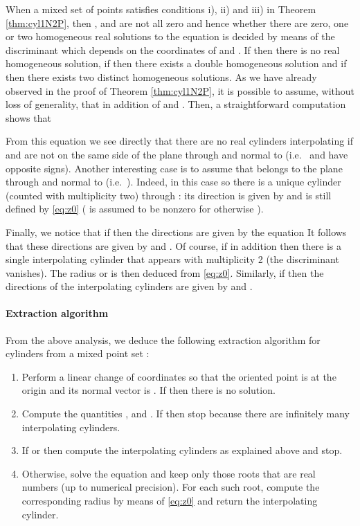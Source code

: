 \documentclass[5p]{elsarticle}
\newcommand{\com}[1]{{\color{black} #1}}
\begin{document}
When a mixed set of points  satisfies conditions i), ii) and iii) in \com{Theorem \ref{thm:cyl1N2P}}, then ,  and  are not all zero and hence \com{whether there are} zero, one or two homogeneous real solutions to the equation  is decided by means of the discriminant   which depends on the coordinates of  and . If  then there is no real homogeneous solution, if  then \com{there exists} a double homogeneous solution and if  then there exists two distinct homogeneous solutions. As we have already observed in the proof of Theorem \ref{thm:cyl1N2P}, it is possible to assume, without loss of generality, that  in addition of  and . Then, a straightforward computation shows that 

\com{From} this equation we see directly that there \com{are} no real cylinders interpolating  if  and  \com{are not} on the same side of the plane through  and normal to  (i.e.~ and  have opposite signs). Another interesting case is to assume that  belongs to the plane through  and normal to  (i.e.~). Indeed, in this case  so there is a unique cylinder (counted with multiplicity two) through  : its direction is given by   and  is still defined by \eqref{eq:z0} ( is assumed to be nonzero for otherwise ).

Finally, we notice that if  then the directions are given by the equation 
It follows that these directions are given by  and . Of course, if in addition  then there is a single \com{interpolating} cylinder that appears with multiplicity 2 (the discriminant vanishes). The radius \com{ or  is} then deduced from \eqref{eq:z0}. Similarly, if  then the directions of the interpolating cylinders are given by  and .


\paragraph{Extraction algorithm} From the above analysis, we deduce the following extraction algorithm \com{for cylinders} from a mixed point set :
\begin{enumerate}
	\item Perform a linear change of coordinates so that the oriented point is at the origin and its normal vector is . If  then there is no solution.
	\item Compute the quantities ,  and . If  then stop because there are infinitely many interpolating cylinders. 
	\item If  or  then compute the interpolating cylinders as explained above and stop.
	\item Otherwise, solve the equation  and keep only those roots that are real numbers (up to numerical precision). For each such root, compute the corresponding radius by means of \eqref{eq:z0} and return the interpolating cylinder. 
\end{enumerate} 
\end{document}
